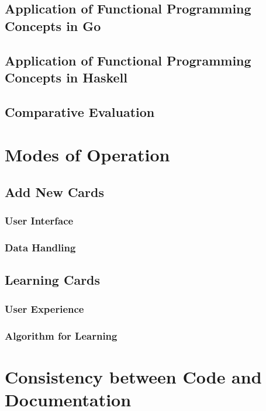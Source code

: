     \section{Application of Functional Programming Concepts in Go}\label{sec:fp-go}
    \section{Application of Functional Programming Concepts in Haskell}\label{sec:fp-haskell}
    \section{Comparative Evaluation}\label{sec:fp-comparative}

\chapter{Modes of Operation}\label{chap:modes-operation}
    \section{Add New Cards}\label{sec:add-cards}
        \subsection{User Interface}\label{subsec:add-cards-ui}
        \subsection{Data Handling}\label{subsec:add-cards-data}
    \section{Learning Cards}\label{sec:learning-cards}
        \subsection{User Experience}\label{subsec:learning-cards-ux}
        \subsection{Algorithm for Learning}\label{subsec:learning-cards-algorithm}

\chapter{Consistency between Code and Documentation}\label{chap:consistency}
